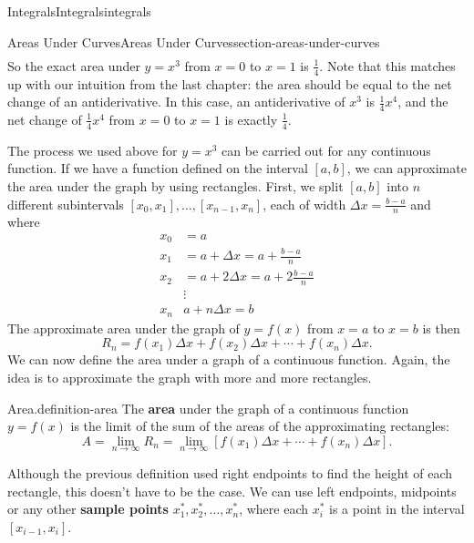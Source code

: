 \documentclass[oneside,10pt,]{book}
\newcommand{\terminology}[1]{\textbf{#1}}
\numberwithin{equation}{section}
\begin{document}
\begin{chapterptx}{Integrals}{}{Integrals}{}{}{integrals}
\begin{sectionptx}{Areas Under Curves}{}{Areas Under Curves}{}{}{section-areas-under-curves}
\begin{align*}
\end{align*}
So the exact area under \(y = x^{3}\) from \(x=0\) to \(x=1\) is \(\frac{1}{4}\). Note that this matches up with our intuition from the last chapter: the area should be equal to the net change of an antiderivative. In this case, an antiderivative of \(x^{3}\) is \(\frac{1}{4}x^{4}\), and the net change of \(\frac{1}{4}x^{4}\) from \(x=0\) to \(x=1\) is exactly \(\frac{1}{4}\).%
\par
\hypertarget{p-407}{}%
The process we used above for \(y = x^{3}\) can be carried out for any continuous function. If we have a function defined on the interval \([a,b]\), we can approximate the area under the graph by using rectangles. First, we split \([a,b]\) into \(n\) different subintervals \([x_{0},x_{1}],\ldots,[x_{n-1},x_{n}]\), each of width \(\Delta x = \frac{b-a}{n}\) and where%
\begin{align*}
x_{0} & = a \\
x_{1} & = a + \Delta x = a+\frac{b-a}{n} \\
x_{2} & = a + 2\Delta x = a + 2\frac{b-a}{n}\\
& \vdots \\
x_{n} & a+n\Delta x = b
\end{align*}
The approximate area under the graph of \(y=f(x)\) from \(x=a\) to \(x=b\) is then%
\begin{equation*}
R_{n} = f(x_{1})\Delta x + f(x_{2})\Delta x + \cdots + f(x_{n})\Delta x.
\end{equation*}
We can now define the area under a graph of a continuous function. Again, the idea is to approximate the graph with more and more rectangles.%
\begin{definition}{Area.}{definition-area}%
\hypertarget{p-408}{}%
The \terminology{area} under the graph of a continuous function \(y=f(x)\) is the limit of the sum of the areas of the approximating rectangles:%
\begin{equation*}
A = \lim_{n\to\infty}R_{n} = \lim_{n\to\infty}[f(x_{1})\Delta x + \cdots + f(x_{n})\Delta x].
\end{equation*}
%
\end{definition}
\hypertarget{p-409}{}%
Although the previous definition used right endpoints to find the height of each rectangle, this doesn't have to be the case. We can use left endpoints, midpoints or any other \terminology{sample points} \(x_{1}^{*}, x_{2}^{*},\ldots,x_{n}^{*}\), where each \(x_{i}^{*}\) is a point in the interval \([x_{i-1},x_{i}].\)%
\par

\end{sectionptx}
\end{chapterptx}
\end{document}
